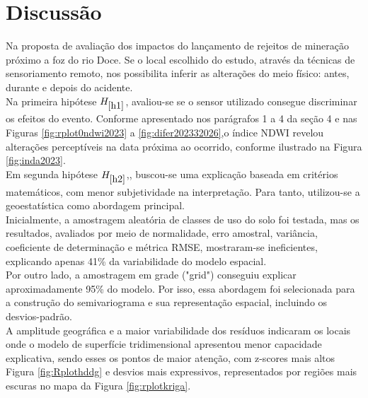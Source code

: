  
\section{Discussão }

 \hspace*{1.25 cm} Na proposta de avaliação dos impactos do lançamento de rejeitos de mineração próximo a foz do rio Doce. Se o local escolhido do estudo, através da técnicas de sensoriamento remoto, nos possibilita inferir as alterações do meio físico: antes, durante e depois do acidente.\\
 \hspace*{1.25 cm} Na primeira hipótese \textbf{\textcolor{blue}{$ H_{\ref{h1}}$}}, avaliou-se se o sensor utilizado consegue discriminar os efeitos do evento. Conforme apresentado nos parágrafos 1 a 4 da seção 4 e nas Figuras \ref{fig:rplot0ndwi2023} a \ref{fig:difer202332026},o índice NDWI revelou alterações perceptíveis na data próxima ao ocorrido, conforme ilustrado na Figura \ref{fig:inda2023}. \\
 \hspace*{1.25 cm} Em segunda hipótese \textbf{\textcolor{blue}{$ H_{\ref{h2}}$}},, buscou-se uma explicação baseada em critérios matemáticos, com menor subjetividade na interpretação. Para tanto, utilizou-se a geoestatística como abordagem principal. \\
 \hspace*{1.25 cm} Inicialmente, a amostragem aleatória de classes de uso do solo foi testada, mas os resultados, avaliados por meio de normalidade, erro amostral, variância, coeficiente de determinação e métrica RMSE, mostraram-se ineficientes, explicando apenas 41\% da variabilidade do modelo espacial.\\
 \hspace*{1.25 cm} Por outro lado, a amostragem em grade ("grid") conseguiu explicar aproximadamente 95\% do modelo. Por isso, essa abordagem foi selecionada para a construção do semivariograma e sua representação espacial, incluindo os desvios-padrão.\\
 \hspace*{1.25 cm} A amplitude geográfica e a maior variabilidade dos resíduos indicaram os locais onde o modelo de superfície tridimensional apresentou menor capacidade explicativa, sendo esses os pontos de maior atenção, com z-scores mais altos Figura \ref{fig:Rplothddg} e desvios mais expressivos, representados por regiões mais escuras no mapa da Figura \ref{fig:rplotkriga}.\\
